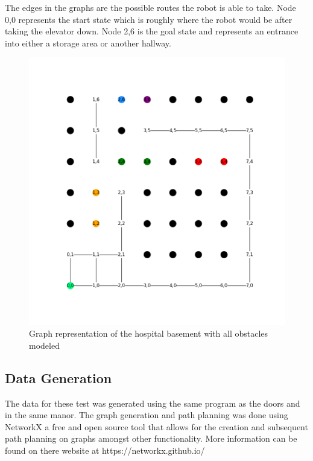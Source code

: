   The edges in the graphs are the possible routes the robot is able to take.
  Node 0,0 represents the start state which is roughly where the robot would
  be after taking the elevator down. Node 2,6 is the goal state and represents
  an entrance into either a storage area or another hallway.

  \begin{figure}[!htb]
    \centering
    \includegraphics[width=\linewidth]{images/results/Full_Hospital.png}
    \caption{Graph representation of the hospital basement with all obstacles modeled}
    \label{figure:basement_congestion_full}
  \end{figure}



  \subsection{ Data Generation }

  The data for these test was generated using the same program as the doors
  and in the same manor. The graph generation and path planning was done using
  NetworkX a free and open source tool that allows for the creation and subsequent
  path planning on graphs amongst other functionality. More information can be
  found on there website at https://networkx.github.io/

